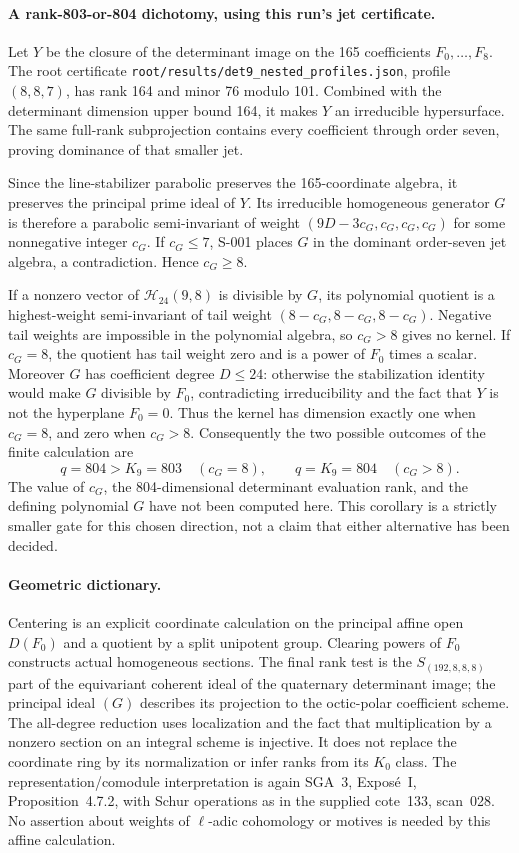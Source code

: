 \paragraph{A rank-803-or-804 dichotomy, using this run's jet certificate.}
Let $Y$ be the closure of the determinant image on the 165 coefficients
$F_0,\ldots,F_8$. The root certificate
\texttt{root/results/det9\_nested\_profiles.json}, profile $(8,8,7)$,
has rank 164 and minor 76 modulo 101. Combined with the determinant
dimension upper bound 164, it makes $Y$ an irreducible hypersurface.
The same full-rank subprojection contains every coefficient through
order seven, proving dominance of that smaller jet.

Since the line-stabilizer parabolic preserves the 165-coordinate
algebra, it preserves the principal prime ideal of $Y$. Its irreducible
homogeneous generator $G$ is therefore a parabolic semi-invariant of
weight $(9D-3c_G,c_G,c_G,c_G)$ for some nonnegative integer $c_G$.
If $c_G\leq7$, S-001 places $G$ in the dominant order-seven jet algebra,
a contradiction. Hence $c_G\geq8$.

If a nonzero vector of $\mathcal H_{24}(9,8)$ is divisible by $G$, its
polynomial quotient is a highest-weight semi-invariant of tail weight
$(8-c_G,8-c_G,8-c_G)$. Negative tail weights are impossible in the
polynomial algebra, so $c_G>8$ gives no kernel. If $c_G=8$, the quotient
has tail weight zero and is a power of $F_0$ times a scalar. Moreover
$G$ has coefficient degree $D\leq24$: otherwise the stabilization
identity would make $G$ divisible by $F_0$, contradicting irreducibility
and the fact that $Y$ is not the hyperplane $F_0=0$. Thus the kernel
has dimension exactly one when $c_G=8$, and zero when $c_G>8$.
Consequently the two possible outcomes of the finite calculation are
\[
  q=804>K_9=803\quad(c_G=8),\qquad
  q=K_9=804\quad(c_G>8).
\]
The value of $c_G$, the 804-dimensional determinant evaluation rank,
and the defining polynomial $G$ have not been computed here. This
corollary is a strictly smaller gate for this chosen direction, not a
claim that either alternative has been decided.

\paragraph{Geometric dictionary.}
Centering is an explicit coordinate calculation on the principal affine
open $D(F_0)$ and a quotient by a split unipotent group. Clearing powers
of $F_0$ constructs actual homogeneous sections. The final rank test is
the $S_{(192,8,8,8)}$ part of the equivariant coherent ideal of the
quaternary determinant image; the principal ideal $(G)$ describes its
projection to the octic-polar coefficient scheme. The all-degree
reduction uses localization and the fact that multiplication by a
nonzero section on an integral scheme is injective. It does not replace
the coordinate ring by its normalization or infer ranks from its
$K_0$ class. The representation/comodule interpretation is again SGA~3,
Expos\'e~I, Proposition~4.7.2, with Schur operations as in the supplied
cote~133, scan~028. No assertion about weights of $\ell$-adic cohomology
or motives is needed by this affine calculation.
